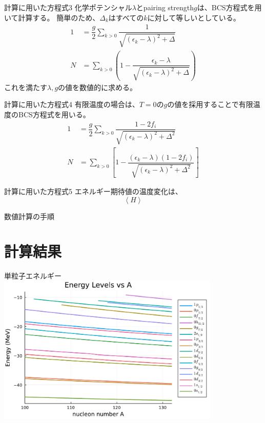 \documentclass[aspectratio=169, 12pt, dvipdfmx]{beamer}
\begin{document}
\begin{frame}{計算に用いた方程式3}
  化学ポテンシャル$\lambda$とpairing strength$g$は、BCS方程式を用いて計算する。
  簡単のため、$\Delta_k$はすべての$k$に対して等しいとしている。
  \begin{align}
    1  &=  \dfrac{g}{2}\sum_{k>0}\dfrac{1}{\sqrt{(\epsilon_k - \lambda)^2+\Delta}}\\
    N       &=  \sum_{k>0}\left(1 - \dfrac{\epsilon_k - \lambda}{\sqrt{(\epsilon_k - \lambda)^2+\Delta}}\right)
  \end{align}
  これを満たす$\lambda,g$の値を数値的に求める。
\end{frame}

\begin{frame}{計算に用いた方程式4}
  有限温度の場合は、$T=0$の$g$の値を採用することで有限温度のBCS方程式を用いる。\cite{goodman1981finite}
  \begin{align}
    1  &=  \dfrac{g}{2}\sum_{k>0}\dfrac{1-2f_i}{\sqrt{(\epsilon_k - \lambda)^2+\Delta^2}}\\
    N       &=  \sum_{k>0}\left[1-\dfrac{(\epsilon_k - \lambda)(1-2f_i)}{\sqrt{(\epsilon_k - \lambda)^2+\Delta^2}}\right] 
  \end{align}
\end{frame}

\begin{frame}{計算に用いた方程式5}
  エネルギー期待値の温度変化は、
  \begin{equation}
    \left\langle H\right\rangle 
  \end{equation}
\end{frame}

\begin{frame}{数値計算の手順}
  
\end{frame}

\section{計算結果}
\begin{frame}{単粒子エネルギー}
  \centering
  \includegraphics[width=0.8\textwidth]{fig_pdf/Energy_vs_A.pdf}
\end{frame}
\end{document}
